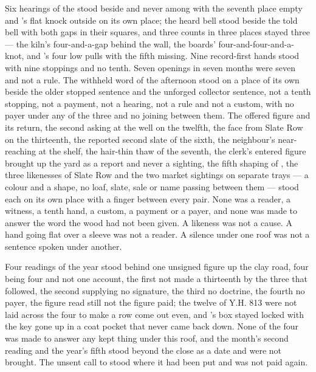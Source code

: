 Six hearings of the  stood beside and never among with the seventh place empty and 's flat knock outside on its own place; the heard bell stood beside the told bell with both gaps in their squares, and three counts in three places stayed three --- the kiln's four-and-a-gap behind the wall, the boards' four-and-four-and-a-knot, and 's four low pulls with the fifth missing. Nine record-first hands stood with nine stoppings and no tenth. Seven openings in seven months were seven and not a rule. The withheld word of the afternoon stood on a place of its own beside the older stopped sentence and the unforged collector sentence, not a tenth stopping, not a payment, not a hearing, not a rule and not a custom, with no payer under any of the three and no joining between them. The offered figure and its return, the second asking at the well on the twelfth, the face from Slate Row on the thirteenth, the reported second slate of the sixth, the neighbour's near-reaching at the shelf, the hair-thin thaw of the seventh, the clerk's entered figure brought up the yard as a report and never a sighting, the fifth shaping of , the three likenesses of Slate Row and the two market sightings on separate trays --- a colour and a shape, no loaf, slate, sale or name passing between them --- stood each on its own place with a finger between every pair. None was a reader, a witness, a tenth hand, a custom, a payment or a payer, and none was made to answer the word the wood had not been given. A likeness was not a cause. A hand going flat over a sleeve was not a reader. A silence under one roof was not a sentence spoken under another.

Four readings of the year stood behind one unsigned figure up the clay road, four being four and not one account, the first not made a thirteenth by the three that followed, the second supplying no signature, the third no doctrine, the fourth no payer, the figure read still not the figure paid; the twelve of Y.H. 813 were not laid across the four to make a row come out even, and 's box stayed locked with the key gone up in a coat pocket that never came back down. None of the four was made to answer any kept thing under this roof, and the month's second reading and the year's fifth stood beyond the close as a date and were not brought. The unsent call to  stood where it had been put and was not paid again.

